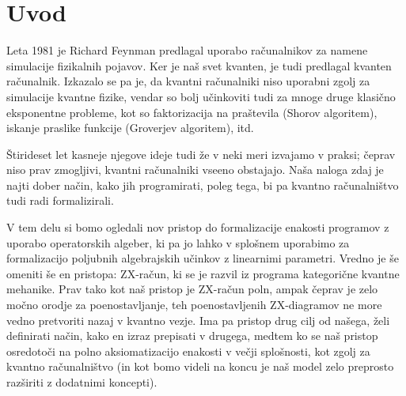 \section{Uvod}

Leta 1981 je Richard Feynman predlagal uporabo računalnikov za namene simulacije fizikalnih pojavov.\cite{feynman-1981}
Ker je naš svet kvanten, je tudi predlagal kvanten računalnik.
Izkazalo se pa je, da kvantni računalniki niso uporabni zgolj za simulacije kvantne fizike,
vendar so bolj učinkoviti tudi za mnoge druge klasično eksponentne probleme, kot so faktorizacija na praštevila (Shorov algoritem), iskanje praslike funkcije (Groverjev algoritem), itd.

Štirideset let kasneje njegove ideje tudi že v neki meri izvajamo v praksi;
čeprav niso prav zmogljivi, kvantni računalniki vseeno obstajajo.
Naša naloga zdaj je najti dober način, kako jih programirati,
poleg tega, bi pa kvantno računalništvo tudi radi formalizirali.

V tem delu si bomo ogledali nov pristop do formalizacije enakosti programov z uporabo operatorskih algeber, ki pa jo lahko v splošnem uporabimo za formalizacijo poljubnih algebrajskih učinkov z linearnimi parametri.\cite{algeff-lin-qpl}
Vredno je še omeniti še en pristopa: ZX-račun\cite{zx-calculus,tdj}, ki se je razvil iz programa kategorične kvantne mehanike.
Prav tako kot naš pristop je ZX-račun poln, ampak čeprav je zelo močno orodje za poenostavljanje, teh poenostavljenih ZX-diagramov ne more vedno pretvoriti nazaj v kvantno vezje.
Ima pa pristop drug cilj od našega, želi definirati način, kako en izraz prepisati v drugega,
medtem ko se naš pristop osredotoči na polno aksiomatizacijo enakosti v večji splošnosti, kot zgolj za kvantno računalništvo (in kot bomo videli na koncu je naš model zelo preprosto razširiti z dodatnimi koncepti).
